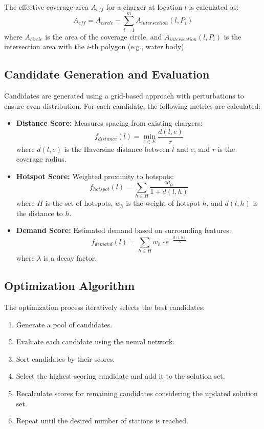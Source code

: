\documentclass[journal]{IEEEtran}
\begin{document}
The effective coverage area \( A_{eff} \) for a charger at location \( l \) is calculated as:
\begin{equation}
A_{eff} = A_{circle} - \sum_{i=1}^{m} A_{intersection}(l, P_i)
\end{equation}
where \( A_{circle} \) is the area of the coverage circle, and \( A_{intersection}(l, P_i) \) is the intersection area with the \( i \)-th polygon (e.g., water body).

\subsection{Candidate Generation and Evaluation}
Candidates are generated using a grid-based approach with perturbations to ensure even distribution. For each candidate, the following metrics are calculated:
\begin{itemize}
    \item \textbf{Distance Score:} Measures spacing from existing chargers:
    \begin{equation}
    f_{distance}(l) = \min_{e \in E} \frac{d(l, e)}{r}
    \end{equation}
    where \( d(l, e) \) is the Haversine distance between \( l \) and \( e \), and \( r \) is the coverage radius.
    \item \textbf{Hotspot Score:} Weighted proximity to hotspots:
    \begin{equation}
    f_{hotspot}(l) = \sum_{h \in H} \frac{w_h}{1 + d(l, h)}
    \end{equation}
    where \( H \) is the set of hotspots, \( w_h \) is the weight of hotspot \( h \), and \( d(l, h) \) is the distance to \( h \).
    \item \textbf{Demand Score:} Estimated demand based on surrounding features:
    \begin{equation}
    f_{demand}(l) = \sum_{h \in H} w_h \cdot e^{-\frac{d(l, h)}{\lambda}}
    \end{equation}
    where \( \lambda \) is a decay factor.
\end{itemize}

\subsection{Optimization Algorithm}
The optimization process iteratively selects the best candidates:
\begin{enumerate}
    \item Generate a pool of candidates.
    \item Evaluate each candidate using the neural network.
    \item Sort candidates by their scores.
    \item Select the highest-scoring candidate and add it to the solution set.
    \item Recalculate scores for remaining candidates considering the updated solution set.
    \item Repeat until the desired number of stations is reached.
\end{enumerate}
\end{document}
